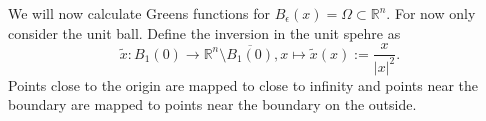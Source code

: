 \documentclass[A4,12pt,twoside]{book}
\begin{document}
We will now calculate Greens functions for $B_\epsilon (x) = \Omega \subset \mathbb{R}^n$. For now only consider the unit ball. Define the inversion in the unit spehre as 
\[
\tilde{x} : B_1 (0) \to \mathbb{R}^n \setminus  \overline{B_1 (0)}, x \mapsto \tilde{x}(x) := \frac{x}{|x|^2}.
\]
Points close to the origin are mapped to close to infinity and points near the boundary are mapped to points near the boundary on the outside.
\end{document}
